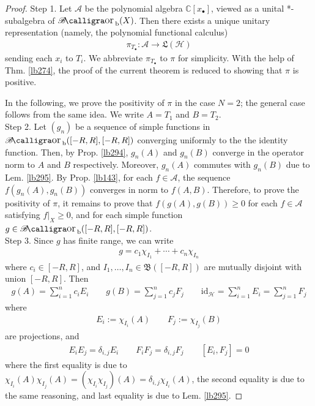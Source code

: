 \documentclass[12pt,b5paper,notitlepage]{article}
\theoremstyle{definition}
\theoremstyle{plain}
\DeclareMathOperator{\Borb}{{\mathscr{B}\text{\kern -2pt {\calligra\large or}}\,}_{\mathrm b}}
\newcommand{\fk}{\mathfrak}
\newcommand{\id}{\mathrm{id}}
\newcommand{\scr}{\mathscr}
\newcommand{\blt}{\bullet}
\newcommand{\Cbb}{\mathbb C}
\newcommand{\MH}{\mathcal H}
\numberwithin{equation}{section}
\begin{document}
\begin{proof}
Step 1. Let $\scr A$ be the polynomial algebra $\Cbb[x_\blt]$, viewed as a unital *-subalgebra of $\Borb(X)$. Then there exists a unique unitary representation (namely, the polynomial functional calculus)
\begin{align*}
\pi_{T_\blt}:\scr A\rightarrow\fk L(\MH)
\end{align*}
sending each $x_i$ to $T_i$. We abbreviate $\pi_{T_\blt}$ to $\pi$ for simplicity. With the help of Thm. \ref{lb274}, the proof of the current theorem is reduced to showing that $\pi$ is positive. 

In the following, we prove the positivity of $\pi$ in the case $N=2$; the general case follows from the same idea. We write $A=T_1$ and $B=T_2$.\\[-1ex]

Step 2. Let $(g_n)$ be a sequence of simple functions in $\Borb([-R,R],[-R,R])$ converging uniformly to the the identity function. Then, by Prop. \ref{lb294}, $g_n(A)$ and $g_n(B)$ converge in the operator norm to $A$ and $B$ respectively. Moreover, $g_n(A)$ commutes with $g_n(B)$ due to Lem. \ref{lb295}. By Prop. \ref{lb143}, for each $f\in\scr A$, the sequence $f(g_n(A),g_n(B))$ converges in norm to $f(A,B)$. Therefore, to prove the positivity of $\pi$, it remains to prove that $f(g(A),g(B))\geq0$ for each $f\in\scr A$ satisfying $f|_X\geq0$, and for each simple function $g\in\Borb([-R,R],[-R,R])$.\\[-1ex]

Step 3. Since $g$ has finite range, we can write
\begin{align*}
g=c_1\chi_{I_1}+\cdots+c_n\chi_{I_n}
\end{align*}
where $c_i\in[-R,R]$, and $I_1,\dots,I_n\in\fk B([-R,R])$ are mutually disjoint with union $[-R,R]$. Then
\begin{align*}
g(A)=\sum_{i=1}^n c_iE_i\qquad g(B)=\sum_{j=1}^n c_jF_j\qquad \id_\MH=\sum_{i=1}^n E_i=\sum_{j=1}^n F_j
\end{align*}
where
\begin{align*}
E_i:=\chi_{I_i}(A)\qquad F_j:=\chi_{I_j}(B)
\end{align*}
are projections, and
\begin{align*}
E_iE_j=\delta_{i,j}E_i\qquad F_iF_j=\delta_{i,j}F_j\qquad [E_i,F_j]=0
\end{align*}
where the first equality is due to $\chi_{I_i}(A)\chi_{I_j}(A)=(\chi_{I_i}\chi_{I_j})(A)=\delta_{i,j}\chi_{I_i}(A)$, the second equality is due to the same reasoning, and last equality is due to Lem. \ref{lb295}. 


\end{proof}
\end{document}
